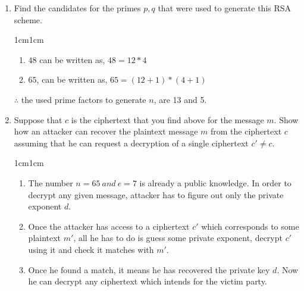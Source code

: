 \documentclass[11pt,letterpaper]{article}
\newenvironment{answer}{\em \color{blue} \begin{adjustwidth}{1cm}{1cm}}{\end{adjustwidth}}
\begin{document}
\begin{enumerate}
\begin{answer}
\begin{enumerate}
			\item Decryption
			\[
			\begin{split}
				plaintext &= c^d ~mod~65\\
				&=60^7~mod~65\\
				&= \left\{ \left( 60^2~mod~65 \right)* \left( 60^2~mod~65 \right)* \left( 60^2~mod~65 \right) * \left( 60^1~mod~65 \right) \right\} ~mod ~65\\
				&= \left\{ \left( 25 \right)* \left( 25 \right)* \left( 25 \right) * \left( 60 \right) \right\} ~mod ~65\\
				&=5~ \because (25^3 * 60 = 14423*65 + 5)
			\end{split}
			\]

		\end{enumerate}
	$\therefore$ the plaintext can be recovered at the receiver after decrypting.
	\end{answer}

		\item Find the candidates for the primes $p,q$ that were used to generate this RSA scheme.
		
		\begin{answer}
			\begin{enumerate}
				\item $48$ can be written as, $48 = 12 * 4$
				\item $65$, can be written as, $65 = \left( 12 + 1 \right) * \left( 4 + 1\right)$
			\end{enumerate}
		$\therefore$ the used prime factors to generate $n$, are 13 and 5.
		\end{answer}
		\pagebreak
		\item Suppose that $c$ is the ciphertext that you find above for the message $m$. Show how an attacker can recover the plaintext message $m$ from the ciphertext $c$ assuming that he can request a decryption of a single ciphertext $c' \neq c$.
		
		\begin{answer}
			\begin{enumerate}
				\item The number $n=65~ and ~ e = 7$ is already a public knowledge. In order to decrypt any given message, attacker has to figure out only the private exponent $d$.
				
				\item Once the attacker has access to a ciphertext  $c'$ which corresponds to some plaintext $m'$, all he has to do is guess some private exponent, decrypt $c'$ using it and check it matches with $m'$.
				
				\item Once he found a match, it means he has recovered the private key $d$. Now he can decrypt any ciphertext which intends for the victim party.
			\end{enumerate}
			 
			 
			
		\end{answer}
		 
	\end{enumerate}
	\pagebreak
\end{document}
